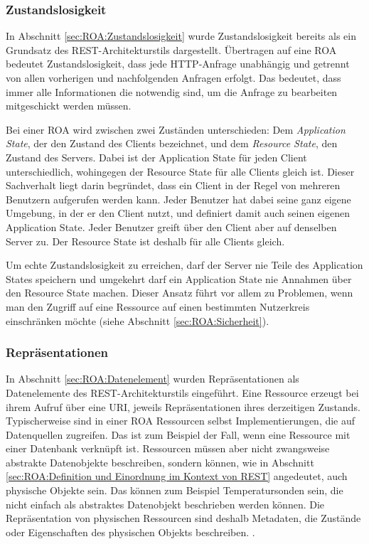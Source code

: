 \subsubsection{Zustandslosigkeit}

In Abschnitt \ref{sec:ROA:Zustandslosigkeit} wurde Zustandslosigkeit bereits als ein Grundsatz des REST-Architekturstils dargestellt. Übertragen auf eine \ac{ROA} bedeutet Zustandslosigkeit, dass jede HTTP-Anfrage unabhängig und getrennt von allen vorherigen und nachfolgenden Anfragen erfolgt. Das bedeutet, dass immer alle Informationen die notwendig sind, um die Anfrage zu bearbeiten mitgeschickt werden müssen.

Bei einer \ac{ROA} wird zwischen zwei Zuständen unterschieden: Dem \emph{Application State}, der den Zustand des Clients bezeichnet, und dem \emph{Resource State}, den Zustand des Servers. Dabei ist der Application State für jeden Client unterschiedlich, wohingegen der Resource State für alle Clients gleich ist. Dieser Sachverhalt liegt darin begründet, dass ein Client in der Regel von mehreren Benutzern aufgerufen werden kann. Jeder Benutzer hat dabei seine ganz eigene Umgebung, in der er den Client nutzt, und definiert damit auch seinen eigenen Application State. Jeder Benutzer greift über den Client aber auf denselben Server zu. Der Resource State ist deshalb für alle Clients gleich. \parencite[vgl.][90\psq]{Ruby2007} 

Um echte Zustandslosigkeit zu erreichen, darf der Server nie Teile des Application States speichern und umgekehrt darf ein Application State nie Annahmen über den Resource State machen. Dieser Ansatz führt vor allem zu Problemen, wenn man den Zugriff auf eine Ressource auf einen bestimmten Nutzerkreis einschränken möchte (siehe Abschnitt \ref{sec:ROA:Sicherheit}).

\subsubsection{Repräsentationen}

In Abschnitt \ref{sec:ROA:Datenelement} wurden Repräsentationen als Datenelemente des REST-Architekturstils eingeführt. Eine Ressource erzeugt bei ihrem Aufruf über eine \ac{URI}, jeweils Repräsentationen ihres derzeitigen Zustands. Typischerweise sind in einer \ac{ROA} Ressourcen selbst Implementierungen, die auf Datenquellen zugreifen. Das ist zum Beispiel der Fall, wenn eine Ressource mit einer Datenbank verknüpft ist. Ressourcen müssen aber nicht zwangsweise abstrakte Datenobjekte beschreiben, sondern können, wie in Abschnitt \ref{sec:ROA:Definition und Einordnung im Kontext von REST} angedeutet, auch physische Objekte sein. Das können zum Beispiel Temperatursonden sein, die nicht einfach als abstraktes Datenobjekt beschrieben werden können. Die Repräsentation von physischen Ressourcen sind deshalb Metadaten, die Zustände oder Eigenschaften des physischen Objekts beschreiben. \parencite[vgl.][91]{Ruby2007}.

